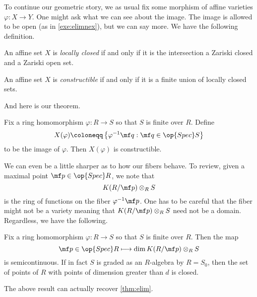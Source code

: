 To continue our geometric story, we as usual fix some morphism of affine varieties $\varphi\colon X\to Y$. One might ask what we can see about the image. The image is allowed to be open (as in \autoref{exe:elimnex}), but we can say more. We have the following definition.
\begin{definition}
	An affine set $X$ is \textit{locally closed} if and only if it is the intersection a Zariski closed and a Zariski open set.
\end{definition}
\begin{definition}[Constructible]
	An affine set $X$ is \textit{constructible} if and only if it is a finite union of locally closed sets.
\end{definition}
And here is our theorem.
\begin{theorem}[Chevalley]
	Fix a ring homomorphism $\varphi\colon R\to S$ so that $S$ is finite over $R$. Define
	\[X(\varphi)\coloneqq\left\{\varphi^{-1}\mf q:\mf q\in\op{Spec}S\right\}\]
	to be the image of $\varphi$. Then $X(\varphi)$ is constructible.
\end{theorem}
We can even be a little sharper as to how our fibers behave. To review, given a maximal point $\mf p\in\op{Spec}R$, we note that
\[K(R/\mf p)\otimes_RS\]
is the ring of functions on the fiber $\varphi^{-1}\mf p$. One has to be careful that the fiber might not be a variety meaning that $K(R/\mf p)\otimes_RS$ need not be a domain. Regardless, we have the following.
\begin{theorem}
	Fix a ring homomorphism $\varphi\colon R\to S$ so that $S$ is finite over $R$. Then the map
	\[\mf p\in\op{Spec}R\longmapsto\dim K(R/\mf p)\otimes_RS\]
	is semicontinuous. If in fact $S$ is graded as an $R$-algebra by $R=S_0$, then the set of points of $R$ with points of dimension greater than $d$ is closed.
\end{theorem}
The above result can actually recover \autoref{thm:elim}.